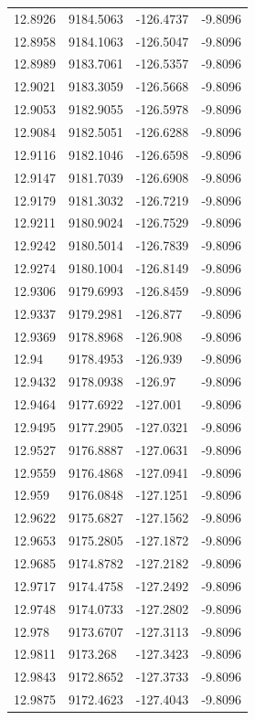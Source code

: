 \begin{table}[H]
\begin{tabular}{llll}
12.8926 & 9184.5063 & -126.4737 & -9.8096 \\
12.8958 & 9184.1063 & -126.5047 & -9.8096 \\
12.8989 & 9183.7061 & -126.5357 & -9.8096 \\
12.9021 & 9183.3059 & -126.5668 & -9.8096 \\
12.9053 & 9182.9055 & -126.5978 & -9.8096 \\
12.9084 & 9182.5051 & -126.6288 & -9.8096 \\
12.9116 & 9182.1046 & -126.6598 & -9.8096 \\
12.9147 & 9181.7039 & -126.6908 & -9.8096 \\
12.9179 & 9181.3032 & -126.7219 & -9.8096 \\
12.9211 & 9180.9024 & -126.7529 & -9.8096 \\
12.9242 & 9180.5014 & -126.7839 & -9.8096 \\
12.9274 & 9180.1004 & -126.8149 & -9.8096 \\
12.9306 & 9179.6993 & -126.8459 & -9.8096 \\
12.9337 & 9179.2981 & -126.877 & -9.8096 \\
12.9369 & 9178.8968 & -126.908 & -9.8096 \\
12.94 & 9178.4953 & -126.939 & -9.8096 \\
12.9432 & 9178.0938 & -126.97 & -9.8096 \\
12.9464 & 9177.6922 & -127.001 & -9.8096 \\
12.9495 & 9177.2905 & -127.0321 & -9.8096 \\
12.9527 & 9176.8887 & -127.0631 & -9.8096 \\
12.9559 & 9176.4868 & -127.0941 & -9.8096 \\
12.959 & 9176.0848 & -127.1251 & -9.8096 \\
12.9622 & 9175.6827 & -127.1562 & -9.8096 \\
12.9653 & 9175.2805 & -127.1872 & -9.8096 \\
12.9685 & 9174.8782 & -127.2182 & -9.8096 \\
12.9717 & 9174.4758 & -127.2492 & -9.8096 \\
12.9748 & 9174.0733 & -127.2802 & -9.8096 \\
12.978 & 9173.6707 & -127.3113 & -9.8096 \\
12.9811 & 9173.268 & -127.3423 & -9.8096 \\
12.9843 & 9172.8652 & -127.3733 & -9.8096 \\
12.9875 & 9172.4623 & -127.4043 & -9.8096 \\

\end{tabular}
\end{table}
